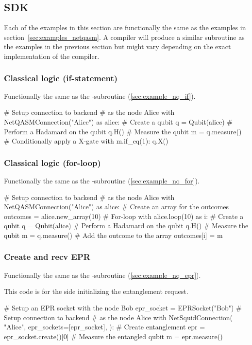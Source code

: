 \subsection{SDK}\label{app:examples_sdk}
Each of the examples in this section are functionally the same as the examples in section~\ref{sec:examples_netqasm}.
A compiler will produce a similar subroutine as the examples in the previous section but might vary depending on the exact implementation of the compiler.


\subsubsection{Classical logic (if-statement)}
Functionally the same as the \netqasm-subroutine (\cref{sec:example_nq_if}).
\begin{pycode}
# Setup connection to backend
# as the node Alice
with NetQASMConnection("Alice") as alice:
  # Create a qubit
  q = Qubit(alice)
  # Perform a Hadamard on the qubit
  q.H()
  # Measure the qubit
  m = q.measure()
  # Conditionally apply a X-gate
  with m.if_eq(1):
    q.X()
\end{pycode}

\subsubsection{Classical logic (for-loop)}
Functionally the same as the \netqasm-subroutine (\cref{sec:example_nq_for}).
\begin{pycode}
# Setup connection to backend
# as the node Alice
with NetQASMConnection("Alice") as alice:
  # Create an array for the outcomes
  outcomes = alice.new_array(10)
  # For-loop
  with alice.loop(10) as i:
    # Create a qubit
    q = Qubit(alice)
    # Perform a Hadamard on the qubit
    q.H()
    # Measure the qubit
    m = q.measure()
    # Add the outcome to the array
    outcomes[i] = m
\end{pycode}

\subsubsection{Create and recv EPR}
Functionally the same as the \netqasm-subroutine (\cref{sec:example_nq_epr}).

This code is for the side initializing the entanglement request.
\begin{pycode}
# Setup an EPR socket with the node Bob
epr_socket = EPRSocket("Bob")
# Setup connection to backend
# as the node Alice
with NetSquidConnection(
"Alice",
epr_sockets=[epr_socket],
):
  # Create entanglement
  epr = epr_socket.create()[0]
  # Measure the entangled qubit
  m = epr.measure()
\end{pycode}

